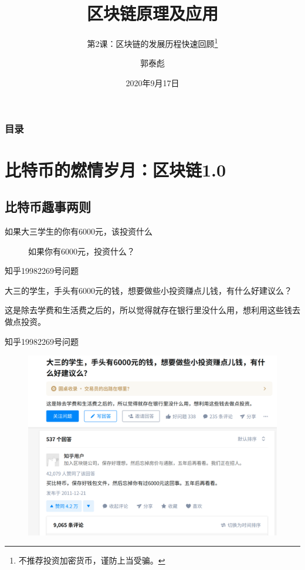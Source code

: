 \documentclass[11pt]{beamer}
\begin{document}
\author{郭泰彪}
\title{区块链原理及应用}
\subtitle{第2课：区块链的发展历程快速回顾\footnote{不推荐投资加密货币，谨防上当受骗。}}
\date{2020年9月17日}

\begin{frame}[plain]
	\maketitle
\end{frame}

\begin{frame}[shrink]
	\frametitle{目录}
	\tableofcontents[sectionstyle=show,subsectionstyle=show/shaded,subsubsectionstyle=show/shaded]
\end{frame}

\section{比特币的燃情岁月：区块链1.0}

\subsection{比特币趣事两则}
\begin{frame}{如果大三学生的你有6000元，该投资什么}
	\begin{figure}
		\centering
		{\Huge 如果你有6000元，投资什么？}
	\end{figure}
\end{frame}

\begin{frame}{知乎19982269号问题}

	大三的学生，手头有6000元的钱，想要做些小投资赚点儿钱，有什么好建议么？

	\footnotesize{这是除去学费和生活费之后的，所以觉得就存在银行里没什么用，想利用这些钱去做点投资。}
\end{frame}

\begin{frame}{知乎19982269号问题}
	\begin{figure}
		\centering
		\includegraphics[width=0.8\linewidth]{figures/zhihu19982269}
		\label{fig:zhihu19982269}
	\end{figure}
\end{frame}
\end{document}
